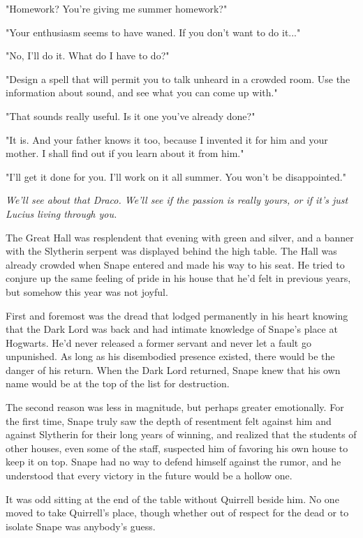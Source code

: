 \documentclass[a4paper,11pt]{article}
\begin{document}
"Homework? You're giving me summer homework?"

"Your enthusiasm seems to have waned. If you don't want to do it..."

"No, I'll do it. What do I have to do?"

"Design a spell that will permit you to talk unheard in a crowded room. Use the information about sound, and see what you can come up with."

"That sounds really useful. Is it one you've already done?"

"It is. And your father knows it too, because I invented it for him and your mother. I shall find out if you learn about it from him."

"I'll get it done for you. I'll work on it all summer. You won't be disappointed."

\emph{We'll see about that Draco. We'll see if the passion is really yours, or if it's just Lucius living through you.}

The Great Hall was resplendent that evening with green and silver, and a banner with the Slytherin serpent was displayed behind the high table. The Hall was already crowded when Snape entered and made his way to his seat. He tried to conjure up the same feeling of pride in his house that he'd felt in previous years, but somehow this year was not joyful.

First and foremost was the dread that lodged permanently in his heart knowing that the Dark Lord was back and had intimate knowledge of Snape's place at Hogwarts. He'd never released a former servant and never let a fault go unpunished. As long as his disembodied presence existed, there would be the danger of his return. When the Dark Lord returned, Snape knew that his own name would be at the top of the list for destruction.

The second reason was less in magnitude, but perhaps greater emotionally. For the first time, Snape truly saw the depth of resentment felt against him and against Slytherin for their long years of winning, and realized that the students of other houses, even some of the staff, suspected him of favoring his own house to keep it on top. Snape had no way to defend himself against the rumor, and he understood that every victory in the future would be a hollow one.

It was odd sitting at the end of the table without Quirrell beside him. No one moved to take Quirrell's place, though whether out of respect for the dead or to isolate Snape was anybody's guess.
\end{document}
